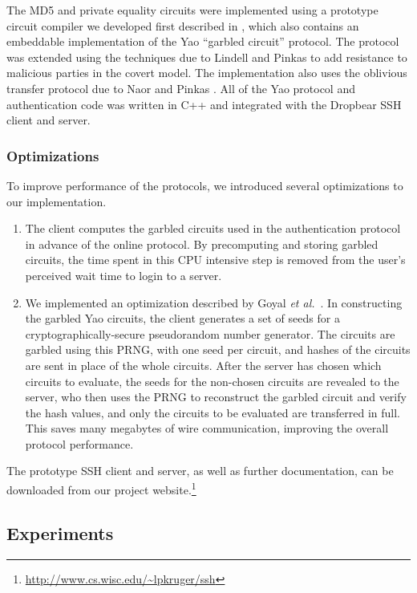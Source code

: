 The MD5 and private equality circuits were implemented using a
prototype circuit compiler we developed first described in
\cite{1398071}, which also contains an embeddable implementation of
the Yao {}``garbled circuit'' protocol. The protocol was extended
using the techniques due to Lindell and Pinkas
\cite{lindellpinkas-eurocrypt07} to add resistance to malicious
parties in the covert model. The implementation also uses the
oblivious transfer protocol due to Naor and Pinkas
\cite{Naor-Pinkas:2001}.  All of the Yao protocol and authentication
code was written in C++ and integrated with the Dropbear SSH
client and server.

\subsubsection{Optimizations}

To improve performance of the protocols, we introduced several
optimizations to our implementation.
\begin{enumerate}
\item The client computes the garbled circuits used in the
authentication protocol in advance of the online protocol.  By
precomputing and storing garbled circuits, the time spent in this CPU
intensive step is removed from the user's perceived wait time to login
to a server.
\item We implemented an optimization described by 
Goyal \textit{et al.}~\cite{goyalmohasselsmith-eurocrypt08}.  In
constructing the garbled Yao circuits, the client generates a set of
seeds for a cryptographically-secure pseudorandom number generator.
The circuits are garbled using this PRNG, with one seed per circuit,
and hashes of the circuits are sent in place of the whole circuits.
After the server has chosen which circuits to evaluate, the seeds for
the non-chosen circuits are revealed to the server, who then uses the
PRNG to reconstruct the garbled circuit and verify the hash values,
and only the circuits to be evaluated are transferred in full.  This
saves many megabytes of wire communication, improving the overall
protocol performance.
\end{enumerate}

The prototype SSH client and server, as well as further documentation,
can be downloaded from our project
website.\footnote{\url{http://www.cs.wisc.edu/~lpkruger/ssh}}


\subsection{Experiments}

